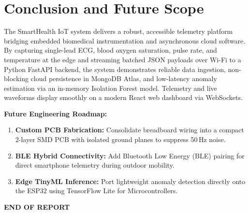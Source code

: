 \documentclass[12pt]{article}
\begin{document}
\vspace{0.06cm}
\section{Conclusion and Future Scope}
\label{sec:conclusion}
The SmartHealth IoT system delivers a robust, accessible telemetry platform bridging embedded biomedical instrumentation and asynchronous cloud software. By capturing single-lead ECG, blood oxygen saturation, pulse rate, and temperature at the edge and streaming batched JSON payloads over Wi-Fi to a Python FastAPI backend, the system demonstrates reliable data ingestion, non-blocking cloud persistence in MongoDB Atlas, and low-latency anomaly estimation via an in-memory Isolation Forest model. Telemetry and live waveforms display smoothly on a modern React web dashboard via WebSockets.

\textbf{Future Engineering Roadmap:}
\begin{enumerate}[itemsep=1pt, parsep=0pt, topsep=1pt]
    \item \textbf{Custom PCB Fabrication:} Consolidate breadboard wiring into a compact 2-layer SMD PCB with isolated ground planes to suppress 50\,Hz noise.
    \item \textbf{BLE Hybrid Connectivity:} Add Bluetooth Low Energy (BLE) pairing for direct smartphone telemetry during outdoor mobility.
    \item \textbf{Edge TinyML Inference:} Port lightweight anomaly detection directly onto the ESP32 using TensorFlow Lite for Microcontrollers.
\end{enumerate}

\vspace{0.8cm}
\begin{center}
    \textbf{\large END OF REPORT}
\end{center}
\end{document}

